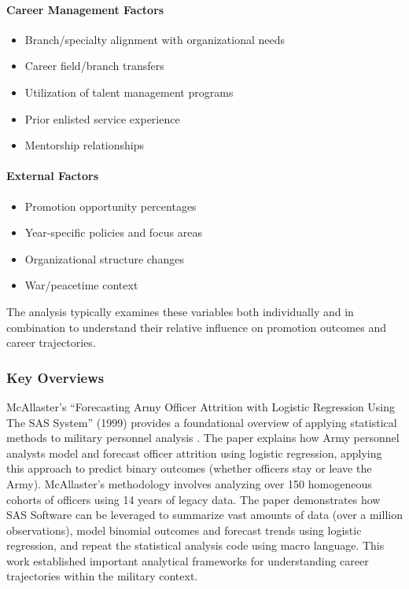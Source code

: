 \documentclass[../main.tex]{subfiles}
\begin{document}
\paragraph{Career Management Factors}
\begin{itemize}
\item Branch/specialty alignment with organizational needs
\item Career field/branch transfers
\item Utilization of talent management programs
\item Prior enlisted service experience
\item Mentorship relationships
\end{itemize}

\paragraph{External Factors}
\begin{itemize}
\item Promotion opportunity percentages
\item Year-specific policies and focus areas
\item Organizational structure changes
\item War/peacetime context
\end{itemize}

The analysis typically examines these variables both individually and in combination to understand their relative influence on promotion outcomes and career trajectories.

\subsubsection{Key Overviews}

McAllaster's ``Forecasting Army Officer Attrition with Logistic Regression Using The SAS System'' (1999) provides a foundational overview of applying statistical methods to military personnel analysis \citep{mcallaster1999}. The paper explains how Army personnel analysts model and forecast officer attrition using logistic regression, applying this approach to predict binary outcomes (whether officers stay or leave the Army). McAllaster's methodology involves analyzing over 150 homogeneous cohorts of officers using 14 years of legacy data. The paper demonstrates how SAS Software can be leveraged to summarize vast amounts of data (over a million observations), model binomial outcomes and forecast trends using logistic regression, and repeat the statistical analysis code using macro language. This work established important analytical frameworks for understanding career trajectories within the military context.
\end{document}
